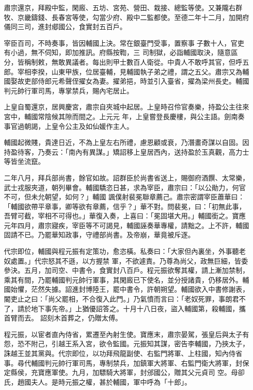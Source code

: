 \begin{pinyinscope}
 肅宗還京，拜殿中監，閑廄、五坊、宮苑、營田、栽接、總監等使。又兼隴右群牧、京畿鑄錢、長春宮等使，勾當少府、殿中二監都使。至德二年十二月，加開府儀同三司，進封郕國公，食實封五百戶。



 宰臣百司，不時奏事，皆因輔國上決。常在銀臺門受事，置察事子數十人，官吏有小過，無不伺知，即加推訊。府縣按鞫，三
 司制獄，必詣輔國取決，隨意區分，皆稱制敕，無敢異議者。每出則甲士數百人衛從。中貴人不敢呼其官，但呼五郎。宰相李揆，山東甲族，位居臺輔，見輔國執子弟之禮，謂之五父。肅宗又為輔國娶故吏部侍郎元希聲侄擢女為妻。擢弟挹，時並引入臺省，擢為梁州長史。輔國判元帥行軍司馬，專掌禁兵，賜內宅居止。



 上皇自蜀還京，居興慶宮，肅宗自夾城中起居。上皇時召伶官奏樂，持盈公主往來宮中，輔國常陰候其隙而間之。上元元
 年，上皇嘗登長慶樓，與公主語。劍南奏事官過朝謁，上皇令公主及如仙媛作主人。



 輔國起微賤，貴達日近，不為上皇左右所禮，慮恩顧或衰，乃潛畫奇謀以自固。因持盈待客，乃奏云：「南內有異謀。」矯詔移上皇居西內，送持盈於玉真觀，高力士等皆坐流竄。



 二年八月，拜兵部尚書，餘官如故。詔群臣於尚書省送上，賜御府酒饌、太常樂，武士戎服夾道，朝列畢會。輔國驕恣日甚，求為宰臣，肅宗曰：「以公勛力，何官不可，但未允朝望，如何？」輔國
 諷僕射裴冕聯章薦己。肅宗密謂宰臣蕭華曰：「輔國欲帶平章事，卿等欲有章薦，信乎？」華不對。問裴冕，曰：「初無此事，吾臂可截，宰相不可得也。」華復入奏，上喜曰：「冕固堪大用。」輔國銜之。寶應元年四月，肅宗寢疾，宰臣等不可謁見，輔國誣奏華專權，請黜之。上不許，輔國固請不已。乃罷華知政事，守禮部尚書。及帝崩，華竟被斥逐。



 代宗即位，輔國與程元振有定策功，愈恣橫。私奏曰：「大家但內裏坐，外事聽老奴處置。」代宗怒其不遜，以方握禁
 軍，不欲遽責。乃尊為尚父，政無巨細，皆委參決。五月，加司空、中書令，食實封八百戶。程元振欲奪其權，請上漸加禁制，乘其有間，乃罷輔國判元帥行軍事，其閑廄已下使名，並分授諸貴，仍移居外。輔國始懼，茫然失據。詔進封博陸王，罷中書令，許朝朔望。輔國欲入中書修謝表，閽吏止之曰：「尚父罷相，不合復入此門。」乃氣憤而言曰：「老奴死罪，事朗君不了，請於地下事先帝。」上猶優詔答之。十月十八日夜，盜入輔國第，殺輔國，攜首臂而去。
 詔刻木首葬之，仍贈太傅。



 程元振，以宦者直內侍省，累遷至內射生使。寶應末，肅宗晏駕，張皇后與太子有怨，恐不附己，引越王系入宮，欲令監國。元振知其謀，密告李輔國，乃挾太子，誅越王並其黨與。代宗即位，以功拜飛龍副使、右監門將軍、上柱國，知內侍省事。尋代輔國判元帥行軍司馬，專制禁兵，加鎮軍大將軍、右監門衛大將軍，封保定縣侯，充寶應軍使。九月，加驃騎大將軍，封邠國公，贈其父元貞司
 空。母卻氏，趙國夫人。是時元振之權，甚於輔國，軍中呼為「十郎」。




\end{pinyinscope}
